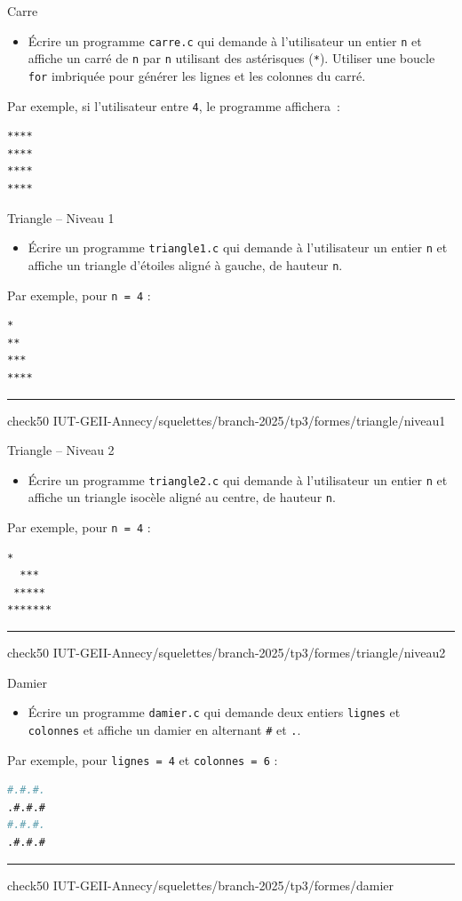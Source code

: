 \begin{UPSTIManipulation}{Carre}
	\begin{itemize}
		\item[$\Box$] Écrire un programme \texttt{carre.c} qui demande à l'utilisateur un entier \texttt{n} et affiche un carré de \texttt{n} par \texttt{n} utilisant des astérisques (\texttt{*}). Utiliser une boucle \texttt{for} imbriquée pour générer les lignes et les colonnes du carré.
	\end{itemize}
	Par exemple, si l'utilisateur entre \texttt{4}, le programme affichera :
	\begin{lstlisting}[language=bash,style=console]
****
****
****
****
\end{lstlisting}
\end{UPSTIManipulation}

\begin{UPSTIManipulation}{Triangle -- Niveau 1}
	\begin{itemize}
		\item[$\Box$] Écrire un programme \texttt{triangle1.c} qui demande à l’utilisateur un entier \texttt{n} et affiche un triangle d’étoiles aligné à gauche, de hauteur \texttt{n}.
	\end{itemize}
	Par exemple, pour \texttt{n = 4} :
	\begin{lstlisting}[language=bash,style=console]
*
**
***
****
\end{lstlisting}
	\hrule
	check50 IUT-GEII-Annecy/squelettes/branch-2025/tp3/formes/triangle/niveau1
\end{UPSTIManipulation}

\begin{UPSTIManipulation}{Triangle -- Niveau 2}
	\begin{itemize}
		\item[$\Box$] Écrire un programme \texttt{triangle2.c} qui demande à l’utilisateur un entier \texttt{n} et affiche un triangle isocèle aligné au centre, de hauteur \texttt{n}.
	\end{itemize}
	Par exemple, pour \texttt{n = 4} :
	\begin{lstlisting}[language=bash,style=console]
   *
  ***
 *****
*******
\end{lstlisting}
	\hrule
	check50 IUT-GEII-Annecy/squelettes/branch-2025/tp3/formes/triangle/niveau2
\end{UPSTIManipulation}

\begin{UPSTIManipulation}{Damier}
	\begin{itemize}
		\item[$\Box$] Écrire un programme \texttt{damier.c} qui demande deux entiers \texttt{lignes} et \texttt{colonnes} et affiche un damier en alternant \texttt{\#} et \texttt{.}.
	\end{itemize}
	Par exemple, pour \texttt{lignes = 4} et \texttt{colonnes = 6} :
	\begin{lstlisting}[language=bash,style=console]
#.#.#.
.#.#.#
#.#.#.
.#.#.#
\end{lstlisting}
	\hrule
	check50 IUT-GEII-Annecy/squelettes/branch-2025/tp3/formes/damier
\end{UPSTIManipulation}

